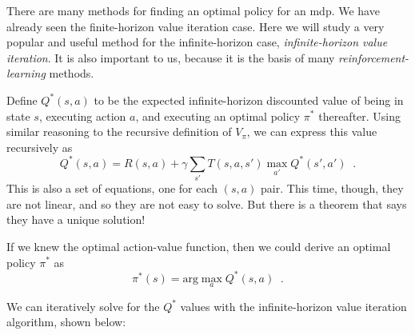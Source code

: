 
There are many methods for finding an optimal policy for an {\sc mdp}.
We have already seen the finite-horizon value iteration case.  Here we
will study a very popular and useful method for the infinite-horizon
case, {\em infinite-horizon value iteration}.  It is also important to
us, because it is the basis of many {\em reinforcement-learning}
methods.

Define $Q^*(s, a)$ to be the expected infinite-horizon discounted
value of being in state $s$, executing action $a$, and executing
an optimal  policy $\pi^*$ thereafter.  Using similar reasoning to the
recursive definition  of  $V_\pi$,  we can express this value
recursively as
\begin{equation}
 Q^*(s, a) = R(s, a) + \gamma\sum_{s'}T(s, a, s')\max_{a'}Q^*(s',
a') \;\;.
\end{equation} 
This is also a set of equations, one for each $(s, a)$ pair.  This
time, though, they are not linear, and so they are not easy to solve.
But there is a theorem  that says they have a unique solution!

If we knew the optimal action-value function, then  we could derive an
optimal policy  $\pi^*$ as
\begin{equation}
 \pi^*(s) = \text{arg}\max_{a}Q^*(s, a) \;\;.
\end{equation}

We can iteratively solve for the $Q^*$ values with the infinite-horizon
value iteration algorithm, shown below:

